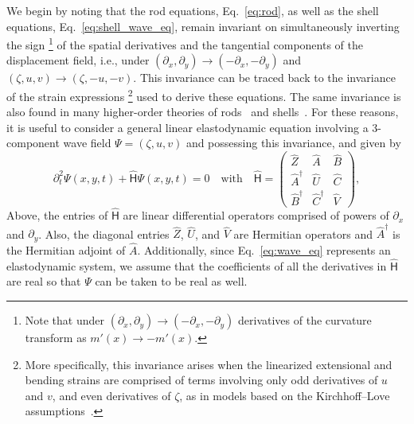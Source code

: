 \begin{subappendices}
We begin by noting that the rod equations, Eq.~\eqref{eq:rod}, as well as the shell equations, Eq.~\eqref{eq:shell_wave_eq}, remain invariant on simultaneously inverting the sign%
\footnote{Note that under $(\partial_{x}, \partial_{y}) \to (-\partial_{x}, -\partial_{y})$ derivatives of the curvature transform as $m'(x) \to -m'(x)$.}
of the spatial derivatives and the tangential components of the displacement field, i.e., under $(\partial_{x}, \partial_{y}) \to (-\partial_{x}, -\partial_{y})$ and $(\zeta, u, v) \to (\zeta, -u, -v)$.
This invariance can be traced back to the invariance of the strain expressions%
\footnote{More specifically, this invariance arises when the linearized extensional and bending strains are comprised of terms involving only odd derivatives of $u$ and $v$, and even derivatives of $\zeta$, as in models based on the Kirchhoff--Love assumptions~\cite{shankar2022}.
}
used to derive these equations.
The same invariance is also found in many higher-order theories of rods~\cite{chidamparam1993,walsh2000} and shells~\cite{doyle2021}.
For these reasons, it is useful to consider a general linear elastodynamic equation involving a 3-component wave field $\Psi = (\zeta, u, v)$ and possessing this invariance, and given by
%
\begin{equation}
  \partial_{t}^{2}\Psi(x, y, t) + \widehat{\mathsf{H}}\Psi(x, y, t) = 0
  \quad\text{with}\quad
  \widehat{\mathsf{H}} =
  \begin{pmatrix}
    \widehat{Z} & \widehat{A} & \widehat{B}\\
    \widehat{A}^{\dagger} & \widehat{U} & \widehat{C}\\
    \widehat{B}^{\dagger} & \widehat{C}^{\dagger} & \widehat{V}
  \end{pmatrix},
  \label{eq:wave_eq}
\end{equation}
%
Above, the entries of $\widehat{\mathsf{H}}$ are linear differential operators comprised of powers of $\partial_{x}$ and $\partial_{y}$.
Also, the diagonal entries $\widehat{Z}$, $\widehat{U}$, and $\widehat{V}$ are Hermitian operators and $\widehat{A}^{\dagger}$ is the Hermitian adjoint of $\widehat{A}$.
Additionally, since Eq.~\eqref{eq:wave_eq} represents an elastodynamic system, we assume that the coefficients of all the derivatives in $\widehat{\mathsf{H}}$ are real so that $\Psi$ can be taken to be real as well.


\end{subappendices}
